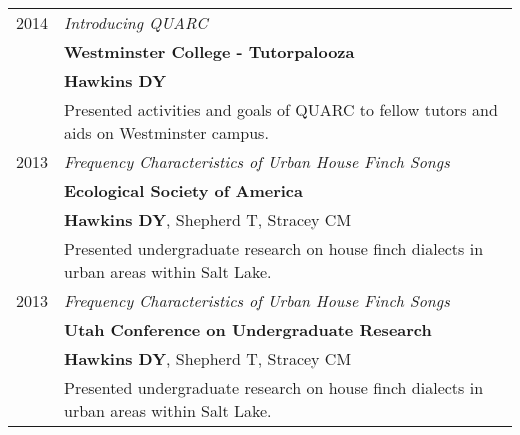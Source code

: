 \documentclass[a4paper,10pt]{report}
\begin{document}
\begin{longtable}{rp{11cm}}
	\textsc{2014} & \emph{Introducing QUARC}                                                                                               \\
	              & \textbf{Westminster College - Tutorpalooza}                                                                            \\
	              & \footnotesize \textbf{Hawkins DY}                                                                                      \\
	              & \small{Presented activities and goals of QUARC to fellow tutors and aids on Westminster campus.}                       \\

	\textsc{2013} & \emph{Frequency Characteristics of Urban House Finch Songs}                                                            \\
	              & \textbf{Ecological Society of America}                                                                                 \\
	              & \footnotesize \textbf{Hawkins DY}, Shepherd T, Stracey CM                                                              \\
	              & \small{Presented undergraduate research on house finch dialects in urban
	areas within Salt Lake.}                                                                                                               \\

	\textsc{2013} & \emph{Frequency Characteristics of Urban House Finch Songs}                                                            \\
	              & \textbf{Utah Conference on Undergraduate Research}                                                                     \\
	              & \footnotesize \textbf{Hawkins DY}, Shepherd T, Stracey CM                                                              \\
	              & \small{Presented undergraduate research on house finch dialects in urban
	areas within Salt Lake.}                                                                                                               \\
\end{longtable}



\end{document}
